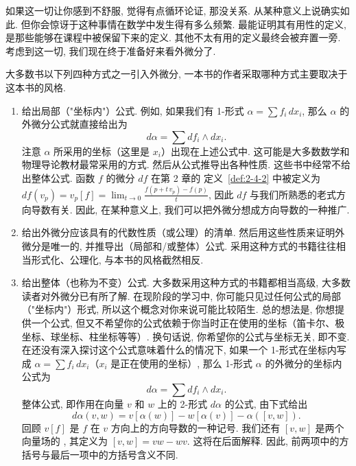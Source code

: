 如果这一切让你感到不舒服, 觉得有点循环论证, 那没关系. 从某种意义上说确实如此. 但你会惊讶于这种事情在数学中发生得有多么频繁. 最能证明其有用性的定义, 是那些能够在课程中被保留下来的定义. 其他不太有用的定义最终会被弃置一旁. 考虑到这一切, 我们现在终于准备好来看外微分了.

大多数书以下列四种方式之一引入外微分, 一本书的作者采取哪种方式主要取决于这本书的风格.
\begin{enumerate}
  \item 给出局部（"坐标内"）公式. 例如, 如果我们有 1-形式 $\alpha=\sum f_i\,dx_i$, 那么 $\alpha$ 的外微分公式就直接给出为
  \[
  d\alpha=\sum df_i\wedge dx_i.
  \]
  注意 $\alpha$ 所采用的坐标（这里是 $x_i$）出现在上述公式中. 这可能是大多数数学和物理导论教材最常采用的方式. 然后从公式推导出各种性质. 这些书中经常不给出整体公式. 函数 $f$ 的微分 $df$ 在第 2 章的 定义~\ref{def:2-4-2} 中被定义为 $df(v_p)=v_p[f]=\lim_{t\to 0}\frac{f(p+t\,v_p)-f(p)}{t}$, 因此 $df$ 与我们所熟悉的老式方向导数有关. 因此, 在某种意义上, 我们可以把外微分想成方向导数的一种推广.
  \item 给出外微分应该具有的代数性质（或公理）的清单. 然后用这些性质来证明外微分是唯一的, 并推导出（局部和/或整体）公式. 采用这种方式的书籍往往相当形式化、公理化, 与本书的风格截然相反.
  \item 给出整体（也称为不变）公式. 大多数采用这种方式的书籍都相当高级, 大多数读者对外微分已有所了解. 在现阶段的学习中, 你可能只见过任何公式的局部（"坐标内"）形式, 所以这个概念对你来说可能比较陌生. 总的想法是, 你想提供一个公式, 但又不希望你的公式依赖于你当时正在使用的坐标（笛卡尔、极坐标、球坐标、柱坐标等等）. 换句话说, 你希望你的公式与坐标无关, 即不变. 在还没有深入探讨这个公式意味着什么的情况下, 如果一个 1-形式在坐标内写成 $\alpha=\sum f_i\,dx_i$（$x_i$ 是正在使用的坐标）, 那么 1-形式 $\alpha$ 的外微分的坐标内公式为
  \[
  d\alpha=\sum df_i\wedge dx_i.
  \]
  整体公式, 即作用在向量 $v$ 和 $w$ 上的 2-形式 $d\alpha$ 的公式, 由下式给出
  \[
  d\alpha(v,w)=v[\alpha(w)]-w[\alpha(v)]-\alpha([v,w]).
  \]
  回顾 $v[f]$ 是 $f$ 在 $v$ 方向上的方向导数的一种记号. 我们还有 $[v,w]$ 是两个向量场的 , 其定义为 $[v,w]=vw-wv$. 这将在后面解释. 因此, 前两项中的方括号与最后一项中的方括号含义不同.


\end{enumerate}
